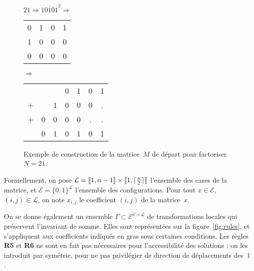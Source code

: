 \documentclass[11pt, openany, a4paper]{article}
\newcommand{\cg }{[\kern-0.15em [}
\newcommand{\cd}{]\kern-0.15em]}
\newcommand{\La}{\mathcal{L}}
\newcommand{\E}{\mathcal{E}}
\begin{document}
\begin{figure}[h]
\centering

$21 \Rightarrow \overline{10101}^2 \Rightarrow$
\begin{tabular}{cccc}
0&1&0&1\\
1&0&0&0\\
0&0&0&0\\
\end{tabular}
$\Rightarrow$
\begin{tabular}{ccccccc}
&&&0&1&0&1\\
+&&1&0&0&0&.\\
+&0&0&0&0&.&.\\
\hline
&0&1&0&1&0&1\\
\end{tabular}

\caption{Exemple de construction de la matrice~$M$ de départ pour factoriser $N=21$.}
\label{fig:init}
\end{figure}

Formellement, on pose $\La=\cg 1, n-1 \cd \times \cg 1, \lceil\frac{n}{2}\rceil\cd$ l'ensemble des cases de la matrice, et $\E=\{0,1\}^\La$ l'ensemble des configurations. Pour tout $x \in \E$, $(i,j)\in\La$, on note $x_{i,j}$ le coefficient $(i,j)$ de la matrice~$x$. 

On se donne également un ensemble $\Gamma \subset \E^{\E\times\La}$ de transformations locales qui préservent l'invariant de somme. Elles sont représentées sur la figure~\ref{fig:rules}, et s'appliquent aux coefficients indiqués en gras sous certaines conditions. Les règles \textbf{R5} et \textbf{R6} ne sont en fait pas nécessaires pour l'accessibilité des solutions : on les introduit par symétrie, pour ne pas privilégier de direction de déplacements des~$1$. 

\end{document}
